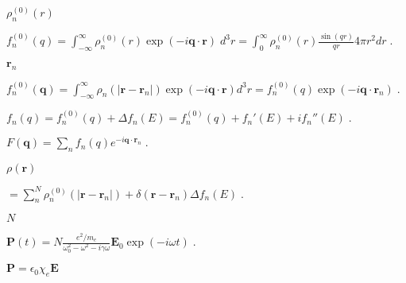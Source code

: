 \documentclass[12pt]{article}
\renewcommand{\vec}[1]{\boldsymbol{#1}}%
\def\lthtmlcheckvsize{\ifdim\ht\sizebox<\vsize 
  \ifdim\wd\sizebox<\hsize\expandafter\hfill\fi \expandafter\vfill
  \else\expandafter\vss\fi}%
\begin{document}
{\newpage\clearpage
{}%
$ \rho_n^{(0)}(r)$%
\lthtmlindisplaymathZ
\lthtmlcheckvsize\clearpage}

{\newpage\clearpage
{}%
$\displaystyle f_n^{(0)}(q)  = \int_{-\infty}^\infty \rho_n^{(0)}(r) \exp(-i
\vec{q}\cdot\vec{r}) \; d^3r = \int_0^\infty \rho_n^{(0)}(r)
\frac{\sin(qr)}{qr}  4\pi r^2 dr \; .$%
\lthtmlindisplaymathZ
\lthtmlcheckvsize\clearpage}

{\newpage\clearpage
{}%
$ \vec{r}_n$%
\lthtmlindisplaymathZ
\lthtmlcheckvsize\clearpage}

{\newpage\clearpage
{}%
$\displaystyle f_n^{(0)}(\vec{q})  = \int_{-\infty}^\infty \rho_n(|\vec{r}-\vec{r}_n|) \exp(-i
\vec{q}\cdot\vec{r}) d^3r = f_n^{(0)}(q)
\exp(-i \vec{q}\cdot\vec{r}_n)  \; .$%
\lthtmlindisplaymathZ
\lthtmlcheckvsize\clearpage}

{\newpage\clearpage
{}%
$\displaystyle f_n(q) = f_n^{(0)}(q) + \Delta f_n(E) = f_n^{(0)}(q) + f_n'(E) + i f_n''(E)  \;.$%
\lthtmlindisplaymathZ
\lthtmlcheckvsize\clearpage}

{\newpage\clearpage
{}%
$\displaystyle F(\vec{q})  = \sum_n f_n(q)
e^{-i \vec{q}\cdot\vec{r}_n}  \; .$%
\lthtmlindisplaymathZ
\lthtmlcheckvsize\clearpage}

{\newpage\clearpage
{}%
$\displaystyle \rho(\vec{r})$%
\lthtmlindisplaymathZ
\lthtmlcheckvsize\clearpage}

{\newpage\clearpage
{}%
$\displaystyle = \sum_n^N \rho_n^{(0)}(|\vec{r}-\vec{r}_n|) +
\delta(\vec{r}-\vec{r}_n) \Delta f_n(E) \; .$%
\lthtmlindisplaymathZ
\lthtmlcheckvsize\clearpage}

{\newpage\clearpage
{}%
$ N$%
\lthtmlindisplaymathZ
\lthtmlcheckvsize\clearpage}

{\newpage\clearpage
{}%
$\displaystyle \vec{P}(t) = N \frac{e^2/m_e}{\omega_0^2 - \omega^2 - i \gamma \omega}\vec{E}_0
\exp(-i\omega t) \;.$%
\lthtmlindisplaymathZ
\lthtmlcheckvsize\clearpage}

{\newpage\clearpage
{}%
$ \vec{P} = \epsilon_0 \chi_e 
\vec{E}$%
\lthtmlindisplaymathZ
\lthtmlcheckvsize\clearpage}
\end{document}
